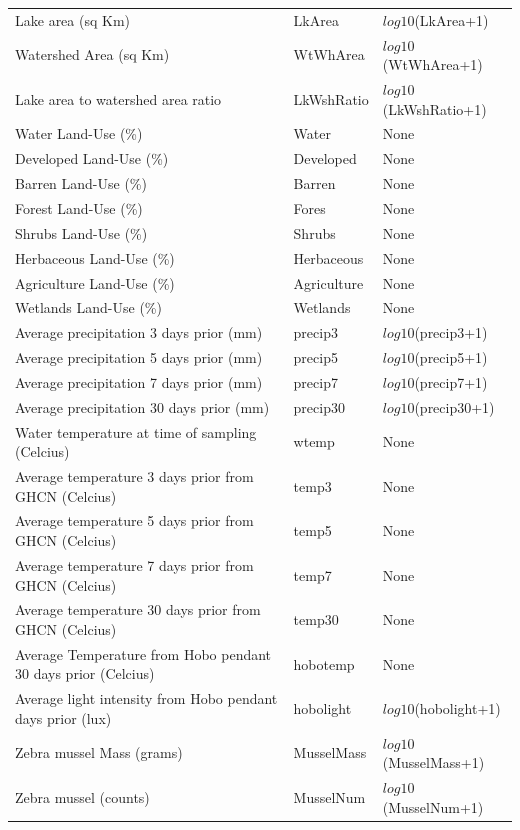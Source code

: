 \begin{center}
\begin{longtable}{p{3.5cm}p{1cm}p{3.3cm}}
Lake area (sq Km) & LkArea & $log10$(LkArea+1) \\
Watershed Area (sq Km) &  WtWhArea & $log10$(WtWhArea+1) \\
Lake area to watershed area ratio & LkWshRatio &  $log10$(LkWshRatio+1) \\
Water Land-Use (\%) & Water &  None \\
Developed Land-Use  (\%) & Developed & None \\
Barren Land-Use (\%) & Barren & None \\
Forest Land-Use (\%) & Fores & None \\
Shrubs Land-Use (\%) & Shrubs & None \\
Herbaceous Land-Use (\%) & Herbaceous  & None \\
Agriculture Land-Use (\%) & Agriculture & None \\
Wetlands Land-Use (\%) & Wetlands & None \\
Average precipitation 3 days prior (mm) & precip3 &  $log10$(precip3+1) \\
Average precipitation 5 days prior (mm)  & precip5 & $log10$(precip5+1) \\
Average precipitation 7 days prior (mm) & precip7 &  $log10$(precip7+1) \\
Average precipitation 30 days prior (mm) & precip30 &  $log10$(precip30+1) \\
Water temperature at time of sampling (Celcius) & wtemp & None \\
Average temperature 3 days prior from GHCN (Celcius) & temp3&  None \\
Average temperature 5 days prior from GHCN (Celcius) & temp5 & None \\
Average temperature 7 days prior  from GHCN (Celcius) &  temp7 & None \\
Average temperature 30 days prior from GHCN (Celcius) & temp30 &  None \\
Average Temperature from Hobo pendant 30 days prior (Celcius) & hobotemp & None \\
Average light intensity from Hobo pendant days prior (lux) & hobolight & $log10$(hobolight+1) \\
Zebra mussel Mass (grams) & MusselMass &  $log10$(MusselMass+1) \\
Zebra mussel (counts) &  MusselNum & $log10$(MusselNum+1) \\
\hline
\end{longtable}
\end{center}

